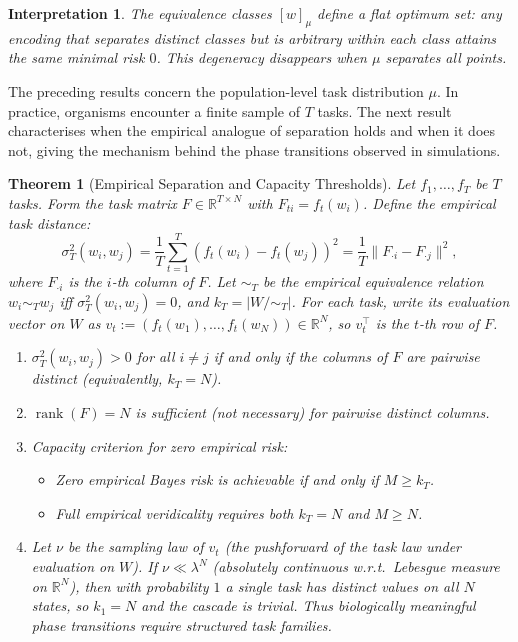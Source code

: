 \documentclass[12pt]{article}
\newtheorem{theorem}{Theorem}[section]
\newtheorem*{interpretation}{Interpretation}
\newcommand{\sigmasq}{\sigma^2}
\newcommand{\rank}{\operatorname{rank}}
\newcommand{\R}{\mathbb{R}}
\begin{document}
\begin{interpretation}
The equivalence classes $[w]_\mu$ define a flat optimum set: any encoding that separates distinct classes but is arbitrary within each class attains the same minimal risk $0$. This degeneracy disappears when $\mu$ separates all points.
\end{interpretation}

The preceding results concern the population-level task distribution $\mu$. In practice, organisms encounter a finite sample of $T$ tasks. The next result characterises when the empirical analogue of separation holds and when it does not, giving the mechanism behind the phase transitions observed in simulations.

\begin{theorem}[Empirical Separation and Capacity Thresholds]\label{thm:empirical}
Let $f_1, \ldots, f_T$ be $T$ tasks. Form the \emph{task matrix} $F \in \R^{T \times N}$ with $F_{ti} = f_t(w_i)$. Define the empirical task distance:
\begin{equation}\label{eq:empirical-distance}
\sigmasq_T(w_i, w_j) = \frac{1}{T} \sum_{t=1}^{T} (f_t(w_i) - f_t(w_j))^2
                      = \frac{1}{T} \|F_{\cdot i} - F_{\cdot j}\|^2,
\end{equation}
where $F_{\cdot i}$ is the $i$-th column of $F$. Let ${\sim_T}$ be the empirical equivalence relation $w_i \sim_T w_j$ iff $\sigmasq_T(w_i, w_j) = 0$, and $k_T = |W/{\sim_T}|$.
For each task, write its evaluation vector on $W$ as $v_t := (f_t(w_1), \ldots, f_t(w_N)) \in \R^N$, so $v_t^\top$ is the $t$-th row of $F$.

\begin{enumerate}[label=(\alph*)]
\item $\sigmasq_T(w_i, w_j) > 0$ for all $i \ne j$ if and only if the columns of $F$ are pairwise distinct (equivalently, $k_T = N$).
\item $\rank(F) = N$ is sufficient (not necessary) for pairwise distinct columns.
\item Capacity criterion for zero empirical risk:
\begin{itemize}
\item Zero empirical Bayes risk is achievable if and only if $M \ge k_T$.
\item Full empirical veridicality requires both $k_T = N$ and $M \ge N$.
\end{itemize}
\item Let $\nu$ be the sampling law of $v_t$ (the pushforward of the task law under evaluation on $W$). If $\nu \ll \lambda^N$ (absolutely continuous w.r.t.\ Lebesgue measure on $\R^N$), then with probability $1$ a single task has distinct values on all $N$ states, so $k_1 = N$ and the cascade is trivial. Thus biologically meaningful phase transitions require structured task families.
\end{enumerate}
\end{theorem}
\end{document}

